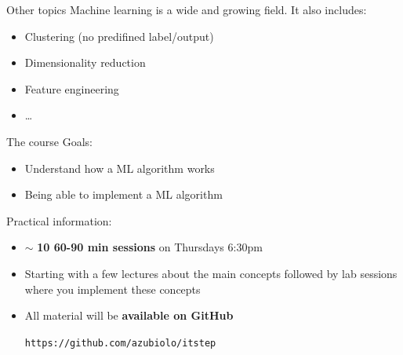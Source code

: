 \documentclass{beamer}
\begin{document}
\begin{frame}{Other topics}
\vfill
Machine learning is a wide and growing field. It also includes:	
\pause 
\vfill
\begin{itemize}
	\item Clustering (no predifined label/output)
\pause 
\vfill
	\item Dimensionality reduction
\pause 
\vfill
	\item Feature engineering
\pause 
\vfill
	\item \ldots
\end{itemize}
\vfill
\end{frame}

\begin{frame}{The course}
Goals:
\begin{itemize}
	\item Understand how a ML algorithm works
	\item Being able to implement a ML algorithm
\end{itemize}
\vfill
\pause 
Practical information:
\begin{itemize}
	\item $\sim$ \textbf{10 60-90 min sessions} on Thursdays 6:30pm
	\item Starting with a few lectures about the main concepts followed by lab sessions where you implement these concepts
	\item All material will be \textbf{available on GitHub}
	\vfill
	\begin{center}
	\texttt{https://github.com/azubiolo/itstep}
	\end{center}
	\vfill
\end{itemize}
\end{frame}
\end{document}
